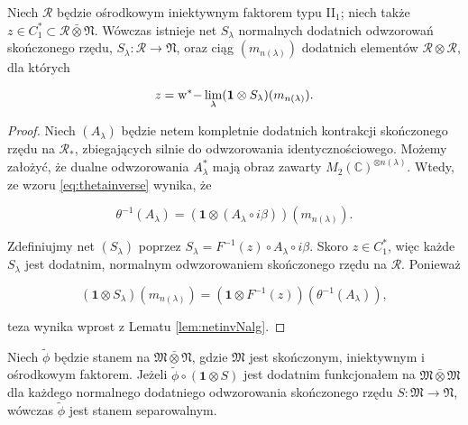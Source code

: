 \begin{Lemma}
\label{lem:netininjectivefactor}
Niech $\mathcal{R}$
będzie ośrodkowym iniektywnym faktorem typu II$\phantom{}_{1}$;
niech także $z \in C_{1}^{*} \subset \mathcal{R} \bar{\otimes} \mathfrak{N}$.
Wówczas istnieje net $S_{\lambda}$ normalnych dodatnich odwzorowań skończonego rzędu,
$S_{\lambda}: \mathcal{R} \rightarrow \mathfrak{N}$,
oraz ciąg $(m_{n(\lambda)})$ dodatnich elementów $\mathcal{R} \otimes \mathcal{R}$,
dla których
\begin{linenomath*}
 \begin{equation}
z = {\rm w^*-} \lim \limits_{\lambda}(\mathbf{1} \otimes S_{\lambda})(m_{n(\lambda)}).
 \end{equation}
\end{linenomath*}
\end{Lemma}
\begin{proof}
Niech $(A_{\lambda})$ będzie netem kompletnie dodatnich kontrakcji
skończonego rzędu na $\mathcal{R}_{*}$,
zbiegających silnie do odwzorowania identycznościowego.
Możemy założyć, że dualne odwzorowania $A_{\lambda}^{*}$
mają obraz zawarty $M_{2}(\mathbb{C})^{\otimes n(\lambda)}$.
Wtedy, ze wzoru \eqref{eq:thetainverse} wynika, że
\begin{linenomath*}
 \begin{equation}
\theta^{-1} (A_{\lambda}) =
( \mathbf{1} \otimes (A_{\lambda} \circ i\beta)) (m_{n(\lambda)}).
 \end{equation}
\end{linenomath*}
Zdefiniujmy net $(S_{\lambda})$ poprzez
$S_{\lambda} = F^{-1}(z) \circ A_{\lambda} \circ i\beta$.
Skoro $z \in C_{1}^{*}$,
więc każde $S_{\lambda}$ jest dodatnim, normalnym odwzorowaniem skończonego rzędu
na $\mathcal{R}$.
Ponieważ
\begin{linenomath*}
 \begin{equation}
(\mathbf{1} \otimes S_{\lambda}) (m_{n(\lambda)}) =
(\mathbf{1} \otimes F^{-1}(z)) (\theta^{-1}(A_{\lambda})),
 \end{equation}
\end{linenomath*}
teza wynika wprost z Lematu \ref{lem:netinvNalg}.
\end{proof}
\begin{Lemma}
\label{lem:step2}
Niech $\tilde{\phi}$ będzie stanem na
$\mathfrak{M} \bar{\otimes} \mathfrak{N}$,
gdzie $\mathfrak{M}$ jest skończonym, iniektywnym i ośrodkowym faktorem.
Jeżeli $\tilde{\phi} \circ ( \mathbf{1} \otimes S)$
jest dodatnim funkcjonałem na
$\mathfrak{M} \bar{\otimes} \mathfrak{M}$
dla każdego normalnego dodatniego odwzorowania skończonego rzędu
$S: \mathfrak{M} \rightarrow \mathfrak{N}$,
wówczas $\tilde{\phi}$ jest stanem separowalnym.
\end{Lemma}
